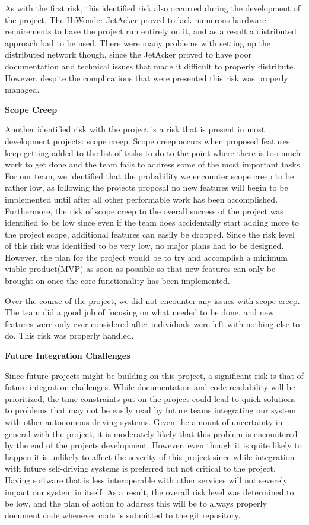 \documentclass[titlepage,draft]{article}
\begin{document}
As with the first risk, this identified risk also occurred during the development of the project. The HiWonder JetAcker proved to lack numerous hardware requirements to have the project run entirely on it, and as a result a distributed approach had to be used. There were many problems with setting up the distributed network though, since the JetAcker proved to have poor documentation and technical issues that made it difficult to properly distribute. However, despite the complications that were presented this risk was properly managed.

\textbf{Scope Creep}

Another identified risk with the project is a risk that is present in most development projects: scope creep. Scope creep occurs when proposed features keep getting added to the list of tasks to do to the point where there is too much work to get done and the team fails to address some of the most important tasks. For our team, we identified that the probability we encounter scope creep to be rather low, as following the projects proposal no new features will begin to be implemented until after all other performable work has been accomplished. Furthermore, the risk of scope creep to the overall success of the project was identified to be low since even if the team does accidentally start adding more to the project scope, additional features can easily be dropped. Since the risk level of this risk was identified to be very low, no major plans had to be designed. However, the plan for the project would be to try and accomplish a minimum viable product(MVP) as soon as possible so that new features can only be brought on once the core functionality has been implemented.

Over the course of the project, we did not encounter any issues with scope creep. The team did a good job of focusing on what needed to be done, and new features were only ever considered after individuals were left with nothing else to do. This risk was properly handled.

\textbf{Future Integration Challenges}

Since future projects might be building on this project, a significant risk is that of future integration challenges. While documentation and code readability will be prioritized, the time constraints put on the project could lead to quick solutions to problems that may not be easily read by future teams integrating our system with other autonomous driving systems. Given the amount of uncertainty in general with the project, it is moderately likely that this problem is encountered by the end of the projects development. However, even though it is quite likely to happen it is unlikely to affect the severity of this project since while integration with future self-driving systems is preferred but not critical to the project. Having software that is less interoperable with other services will not severely impact our system in itself. As a result, the overall risk level was determined to be low, and the plan of action to address this will be to always properly document code whenever code is submitted to the git repository.
\end{document}
